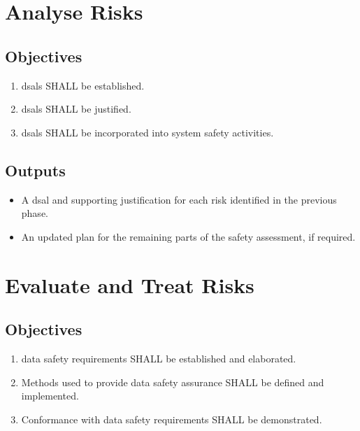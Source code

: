 \section{Analyse Risks}
\subsection{Objectives}
\begin{enumerate}[label=\color{dsiwgAccentColour}{3-\arabic*}]
	\item \Glspl{dsal} SHALL be established.
	\item \Glspl{dsal} SHALL be justified.
	\item \Glspl{dsal} SHALL be incorporated into system safety activities.
\end{enumerate}

\subsection{Outputs}
\begin{itemize}
	\item A \gls{dsal} and supporting justification for each risk identified in the previous phase.
	\item An updated plan for the remaining parts of the safety assessment, if required.
\end{itemize}

\section{Evaluate and Treat Risks}
\subsection{Objectives}
\begin{enumerate}[label=\color{dsiwgAccentColour}{4-\arabic*}]
	\item {}\Glspl{data safety requirement} SHALL be established and elaborated.
	\item Methods used to provide data safety assurance SHALL be defined and implemented.
	\item Conformance with \glspl{data safety requirement} SHALL be demonstrated.	
\end{enumerate}

